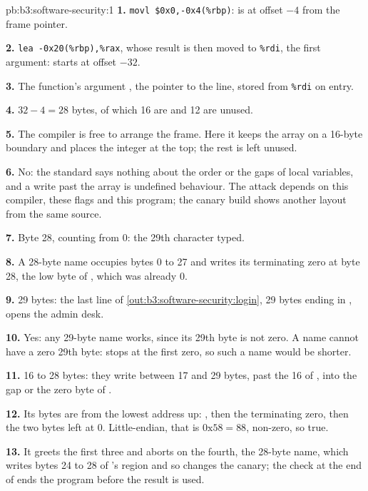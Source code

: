 \begin{solution}{pb:b3:software-security:1}
\textbf{1.} \texttt{movl \$0x0,-0x4(\%rbp)}:  is at offset $-4$ from the frame pointer.

\textbf{2.} \texttt{lea -0x20(\%rbp),\%rax}, whose result is then moved to \texttt{\%rdi}, the first argument:  starts at offset $-32$.

\textbf{3.} The function's argument , the pointer to the line, stored from \texttt{\%rdi} on entry.

\textbf{4.} $32 - 4 = 28$ bytes, of which 16 are  and 12 are unused.

\textbf{5.} The compiler is free to arrange the frame. Here it keeps the array on a 16-byte boundary and places the integer at the top; the rest is left unused.

\textbf{6.} No: the standard says nothing about the order or the gaps of local variables, and a write past the array is undefined behaviour. The attack depends on this compiler, these flags and this program; the canary build shows another layout from the same source.

\textbf{7.} Byte 28, counting from 0: the 29th character typed.

\textbf{8.} A 28-byte name occupies bytes 0 to 27 and  writes its terminating zero at byte 28, the low byte of , which was already 0.

\textbf{9.} 29 bytes: the last line of \cref{out:b3:software-security:login}, 29 bytes ending in , opens the admin desk.

\textbf{10.} Yes: any 29-byte name works, since its 29th byte is not zero. A name cannot have a zero 29th byte:  stops at the first zero, so such a name would be shorter.

\textbf{11.} 16 to 28 bytes: they write between 17 and 29 bytes, past the 16 of , into the gap or the zero byte of .

\textbf{12.} Its bytes are  from the lowest address up: , then the terminating zero, then the two bytes left at 0. Little-endian, that is $\mathrm{0x58} = 88$, non-zero, so true.

\textbf{13.} It greets the first three and aborts on the fourth, the 28-byte name, which writes bytes 24 to 28 of 's region and so changes the canary; the check at the end of  ends the program before the result is used.


\end{solution}
